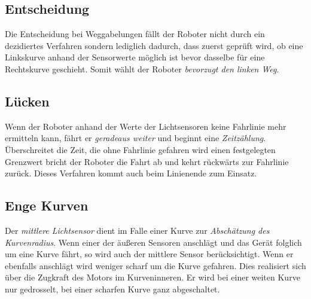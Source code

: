 \subsection{Entscheidung}

Die Entscheidung bei Weggabelungen fällt der Roboter nicht durch ein dezidiertes Verfahren sondern lediglich dadurch, dass zuerst geprüft wird, ob eine Linkskurve anhand der Sensorwerte möglich ist bevor dasselbe für eine Rechtskurve geschieht. Somit wählt der Roboter \textit{bevorzugt den linken Weg}.

\subsection{Lücken}

Wenn der Roboter anhand der Werte der Lichtsensoren keine Fahrlinie mehr ermitteln kann, fährt er \textit{geradeaus weiter} und beginnt eine \textit{Zeitzählung}. Überschreitet die Zeit, die ohne Fahrlinie gefahren wird einen festgelegten Grenzwert bricht der Roboter die Fahrt ab und kehrt rückwärts zur Fahrlinie zurück. Dieses Verfahren kommt auch beim Linienende zum Einsatz.

\subsection{Enge Kurven}

Der \textit{mittlere Lichtsensor} dient im Falle einer Kurve zur \textit{Abschätzung des Kurvenradius}. Wenn einer der äußeren Sensoren anschlägt und das Gerät folglich um eine Kurve fährt, so wird auch der mittlere Sensor berücksichtigt. Wenn er ebenfalls anschlägt wird weniger scharf um die Kurve gefahren. Dies realisiert sich über die Zugkraft des Motors im Kurveninneren. Er wird bei einer weiten Kurve nur gedrosselt, bei einer scharfen Kurve ganz abgeschaltet.